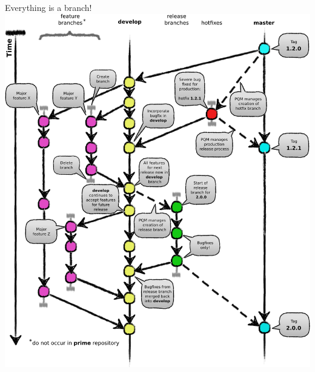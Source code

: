 

\begin{frame}{Everything is a branch!}
	\includegraphics[height=0.9\textheight, width=\textwidth]{gitflow}
\end{frame}


